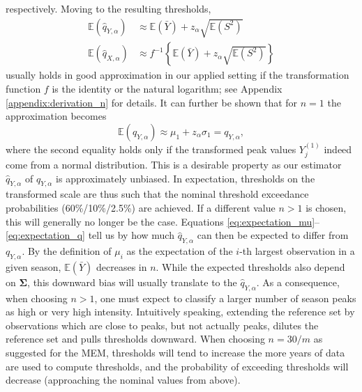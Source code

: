 \documentclass{article}
\newcommand{\sd}{s}
\begin{document}
respectively. Moving to the resulting thresholds,
\begin{align}
\mathbb{E}(\hat{q}_{Y, \alpha}) & \approx \mathbb{E}(\bar{Y}) + z_\alpha \sqrt{\mathbb{E}(S^2)}
\label{eq:expectation_q}\\
\mathbb{E}(\hat{q}_{X, \alpha}) & \approx f^{-1}\left\{\mathbb{E}(\bar{Y}) + z_\alpha \sqrt{\mathbb{E}(S^2)}\right\}
\label{eq:expectation_q2}
\end{align}
usually holds in good approximation in our applied setting if the transformation function $f$ is the identity or the natural logarithm; see Appendix \ref{appendix:derivation_n} for details. It can further be shown that for $n = 1$ the approximation becomes
$$
\mathbb{E}(\hat{q}_{Y, \alpha}) \approx \mu_1 + z_\alpha \sigma_1 = q_{Y, \alpha},
$$
where the second equality holds only if the transformed peak values $Y_{j}^{(1)}$ indeed come from a normal distribution.  This is a desirable property as our estimator $\hat{q}_{Y, \alpha}$ of $q_{Y, \alpha}$ is approximately unbiased. In expectation, thresholds on the transformed scale are thus such that the nominal threshold exceedance probabilities (60\%/10\%/2.5\%) are achieved. If a different value $n > 1$ is chosen, this will generally no longer be the case. Equations \eqref{eq:expectation_mu}--\eqref{eq:expectation_q} tell us by how much $\hat{q}_{Y, \alpha}$ can then be expected to differ from $q_{Y, \alpha}$. By the definition of $\mu_i$ as the expectation of the $i$-th largest observation in a given season, $\mathbb{E}(\bar{Y})$ decreases in $n$. While the expected thresholds also depend on $\mathbf{\Sigma}$, this downward bias will usually translate to the $\hat{q}_{Y, \alpha}$. As a consequence, when choosing $n > 1$, one must expect to classify a larger number of season peaks as high or very high intensity. Intuitively speaking, extending the reference set by observations which are close to peaks, but not actually peaks, dilutes the reference set and pulls thresholds downward. When choosing $n = 30/m$ as suggested for the MEM, thresholds will tend to increase the more years of data are used to compute thresholds, and the probability of exceeding thresholds will decrease (approaching the nominal values from above). 
\end{document}
